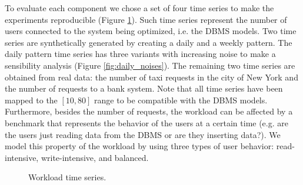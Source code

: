 \documentclass[a4paper, 12pt]{article} %
\begin{document}
	To evaluate each component we chose a set of four time series to make the experiments reproducible (Figure \ref{fig:time_series}). Such time series represent the number of users connected to the system being optimized, i.e. the DBMS models.  Two time series are synthetically generated by creating a daily and a weekly pattern. The daily pattern time series has three variants with increasing noise to make a sensibility analysis (Figure \ref{fig:daily_noises}). The remaining two time series are obtained from real data: the number of taxi requests in the city of New York and the number of requests to a bank system. Note that all time series have been mapped to the $[10, 80]$ range to be compatible with the DBMS models. \\
	Furthermore, besides the number of requests, the workload can be affected by a benchmark that represents the behavior of the users at a certain time (e.g. are the users just reading data from the DBMS or are they inserting data?). We model this property of the workload by using three types of user behavior: read-intensive, write-intensive, and balanced.
	\begin{figure}\centering
		 \hfill
		
		\caption{Workload time series.}
		\label{fig:time_series}
	\end{figure}
	
\end{document}
